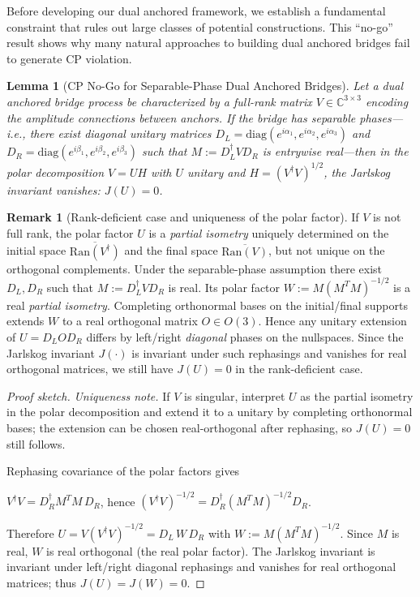\documentclass[11pt]{article}
\theoremstyle{plain}
\newtheorem{lemma}[theorem]{Lemma}
\theoremstyle{definition}
\newtheorem{remark}[theorem]{Remark}
\begin{document}
Before developing our dual anchored framework, we establish a fundamental constraint that rules out large classes of potential constructions. This ``no-go'' result shows why many natural approaches to building dual anchored bridges fail to generate CP violation.

\begin{lemma}[CP No-Go for Separable-Phase Dual Anchored Bridges]\label{lem:cp-nogo}
  Let a dual anchored bridge process be characterized by a \emph{full-rank} matrix $V \in \mathbb{C}^{3\times 3}$ encoding the amplitude connections between anchors. If the bridge has separable phases—i.e., there exist diagonal unitary matrices $D_L=\mathrm{diag}(e^{i\alpha_1},e^{i\alpha_2},e^{i\alpha_3})$ and $D_R=\mathrm{diag}(e^{i\beta_1},e^{i\beta_2},e^{i\beta_3})$ such that $M:=D_L^\dagger V D_R$ is entrywise real—then in the polar decomposition $V=UH$ with $U$ unitary and $H=(V^\dagger V)^{1/2}$, the Jarlskog invariant vanishes: $J(U)=0$.
\end{lemma}

\begin{remark}[Rank-deficient case and uniqueness of the polar factor]
  If $V$ is not full rank, the polar factor $U$ is a \emph{partial isometry} uniquely determined on the initial space $\overline{\mathrm{Ran}(V^\dagger)}$ and the final space $\overline{\mathrm{Ran}(V)}$, but not unique on the orthogonal complements. Under the separable-phase assumption there exist $D_L,D_R$ such that $M:=D_L^\dagger V D_R$ is real. Its polar factor $W:=M(M^T M)^{-1/2}$ is a real \emph{partial isometry}. Completing orthonormal bases on the initial/final supports extends $W$ to a real orthogonal matrix $O\in O(3)$. Hence any unitary extension of $U=D_L O D_R$ differs by left/right \emph{diagonal} phases on the nullspaces. Since the Jarlskog invariant $J(\cdot)$ is invariant under such rephasings and vanishes for real orthogonal matrices, we still have $J(U)=0$ in the rank-deficient case.
\end{remark}

\begin{proof}[Proof sketch]

  \noindent\emph{Uniqueness note.} If $V$ is singular, interpret $U$ as the partial isometry in the polar decomposition and extend it to a unitary by completing orthonormal bases; the extension can be chosen real-orthogonal after rephasing, so $J(U)=0$ still follows.

  Rephasing covariance of the polar factors gives

  $V^\dagger V = D_R^\dagger M^T M\, D_R$, hence $(V^\dagger V)^{-1/2} = D_R^\dagger (M^T M)^{-1/2} D_R$.

  Therefore $U=V(V^\dagger V)^{-1/2}=D_L\,W\,D_R$ with $W:=M(M^T M)^{-1/2}$.
  Since $M$ is real, $W$ is real orthogonal (the real polar factor). The Jarlskog invariant is invariant under left/right diagonal rephasings and vanishes for real orthogonal matrices; thus $J(U)=J(W)=0$.
\end{proof}
\end{document}
